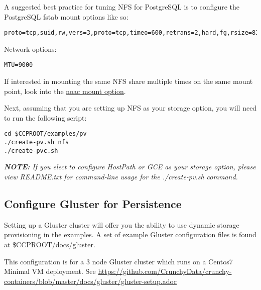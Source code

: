 \documentclass[letterpaper,12pt]{article}
\begin{document}
A suggested best practice for tuning NFS for PostgreSQL is to configure the PostgreSQL fstab mount options like so:
\vspace{.75em}
\begin{lstlisting}
proto=tcp,suid,rw,vers=3,proto=tcp,timeo=600,retrans=2,hard,fg,rsize=8192,wsize=8192
\end{lstlisting}

Network options:
\vspace{.75em}
\begin{lstlisting}
MTU=9000
\end{lstlisting}

If interested in mounting the same NFS share multiple times on the same mount point, look into the \href{https://www.novell.com/support/kb/doc.php?id=7010210}{noac mount option}.

Next, assuming that you are setting up NFS as your storage option, you will need to run the following script:
\vspace{.75em}
\begin{lstlisting}
cd $CCPROOT/examples/pv
./create-pv.sh nfs
./create-pvc.sh
\end{lstlisting}

\begin{leftbar}
\textit{\textbf{NOTE: }If you elect to configure HostPath or GCE as your storage option, please view README.txt for command-line usage for the ./create-pv.sh command.}
\end{leftbar}

\subsection{Configure Gluster for Persistence}\label{/_configure_container_storage/_configure_gluster_for_persistence}

Setting up a Gluster cluster will offer you the ability to use dynamic storage provisioning in the examples. A set of example Gluster configuration files is found at \$CCPROOT/docs/gluster.

This configuration is for a 3 node Gluster cluster which runs on a Centos7 Minimal VM deployment. See \href{https://github.com/CrunchyData/crunchy-containers/blob/master/docs/gluster/gluster-setup.adoc}{https://github.com/CrunchyData/crunchy-containers/blob/master/docs/gluster/gluster-setup.adoc}
\end{document}

